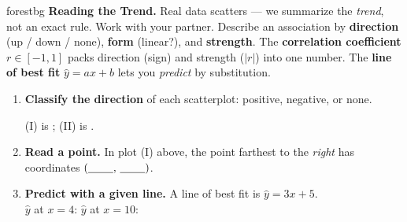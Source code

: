 \documentclass[10pt]{article}
\newcommand{\lgrid}[4]{%
  \draw[step=1, linegray!40, very thin] (#1,#3) grid (#2,#4);
  \draw[->, semithick, charcoal] (#1,0)--(#2,0) node[below right, font=\scriptsize]{$x$};
  \draw[->, semithick, charcoal] (0,#3)--(0,#4) node[left, font=\scriptsize]{$y$};}
\newcommand{\dpt}[2]{\fill[navy] (#1,#2) circle (2.8pt);}
\begin{document}

\vspace{0.08in}

\begin{headlinebox}{forestbg}
\small\textbf{Reading the Trend.} Real data scatters --- we summarize the \emph{trend}, not an exact rule.
Work with your partner. Describe an association by \textbf{direction} (up / down / none), \textbf{form}
(linear?), and \textbf{strength}. The \textbf{correlation coefficient} $r\in[-1,1]$ packs direction (sign)
and strength ($|r|$) into one number. The \textbf{line of best fit} $\hat y=ax+b$ lets you \emph{predict}
by substitution.
\end{headlinebox}

\vspace{0.06in}

\begin{tcolorbox}[colback=white, colframe=black!40, title=\textbf{Tier R --- Remediate},
    fonttitle=\bfseries, arc=1.5mm, left=3mm, right=3mm, top=2mm, bottom=2mm, breakable]
\begin{enumerate}[leftmargin=1.7em, itemsep=9pt]
  \item \textbf{Classify the direction} of each scatterplot: positive, negative, or none.
        \begin{center}
        \hspace{0.5cm}
        \end{center}
        (I) is \blank{2.4cm}; \quad (II) is \blank{2.4cm}.
  \item \textbf{Read a point.} In plot (I) above, the point farthest to the \emph{right} has coordinates
        $(\blank{0.8cm},\,\blank{0.8cm})$.
  \item \textbf{Predict with a given line.} A line of best fit is $\hat y=3x+5$.
        \\[3pt]
        $\hat y$ at $x=4$: \blank{1.6cm} \qquad $\hat y$ at $x=10$: \blank{1.6cm}
\end{enumerate}
\end{tcolorbox}
\end{document}
